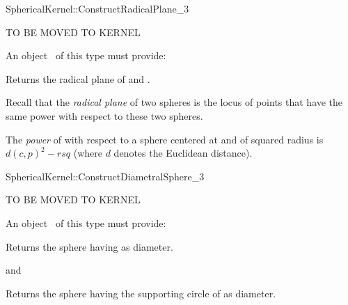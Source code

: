 \begin{ccRefFunctionObjectConcept}{SphericalKernel::ConstructRadicalPlane_3}

TO BE MOVED TO KERNEL

An object \ccVar\ of this type must provide:

{Returns the radical plane of  and .}

Recall that the \textit{radical plane} of two spheres is the 
locus of points  that have the same power with respect 
to these two spheres.

The \textit{power} of  with respect to a sphere  centered at 
 and of squared radius  is $ d(c,p)^2 - rsq $
(where $d$ denotes the Euclidean distance). 

\end{ccRefFunctionObjectConcept}
\begin{ccRefFunctionObjectConcept}{SphericalKernel::ConstructDiametralSphere_3}

TO BE MOVED TO KERNEL

An object \ccVar\ of this type must provide:

{Returns the sphere having  as diameter.}

and

{Returns the sphere having the supporting circle of  as diameter.}

\end{ccRefFunctionObjectConcept}
